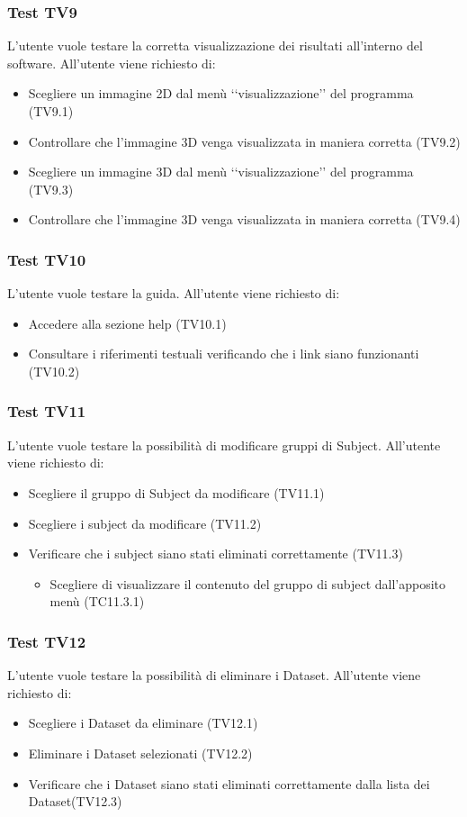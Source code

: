 \subsubsection{Test TV9}
\label{tv9}
L'utente vuole testare la corretta visualizzazione dei risultati all'interno del software.
All'utente viene richiesto di:
\begin{itemize}
\item Scegliere un immagine 2D dal menù \lq\lq{}visualizzazione\rq\rq{} del programma (TV9.1)
\item Controllare che l'immagine 3D venga visualizzata in maniera corretta (TV9.2)
\item Scegliere un immagine 3D dal menù \lq\lq{}visualizzazione\rq\rq{} del programma (TV9.3)
\item Controllare che l'immagine 3D venga visualizzata in maniera corretta (TV9.4)
\end{itemize}

\subsubsection{Test TV10}
\label{tv10}
L'utente vuole testare la guida.
All'utente viene richiesto di:
\begin{itemize}
\item Accedere alla sezione help (TV10.1)
\item Consultare i riferimenti testuali verificando che i link siano funzionanti (TV10.2)
\end{itemize}

\subsubsection{Test TV11}
\label{tv11}
L'utente vuole testare la possibilità di modificare gruppi di Subject.
All'utente viene richiesto di:
\begin{itemize}
\item Scegliere il gruppo di Subject da modificare (TV11.1)
\item Scegliere i subject da modificare (TV11.2)
\item Verificare che i subject siano stati eliminati correttamente (TV11.3)
	\begin{itemize}
	\item Scegliere di visualizzare il contenuto del gruppo di subject dall'apposito menù (TC11.3.1)
	\end{itemize}
\end{itemize}
	
\subsubsection{Test TV12}
\label{tv12}
L'utente vuole testare la possibilità di eliminare i Dataset.
All'utente viene richiesto di:
\begin{itemize}
\item Scegliere i Dataset da eliminare (TV12.1)
\item Eliminare i Dataset selezionati (TV12.2)
\item Verificare che i Dataset siano stati eliminati correttamente dalla lista dei Dataset(TV12.3)
\end{itemize}